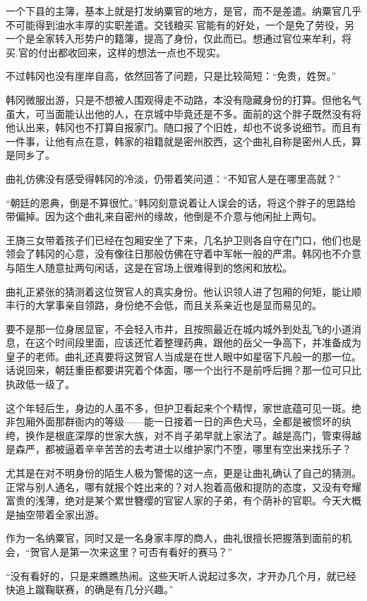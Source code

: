 一个下县的主簿，基本上就是打发纳粟官的地方，是官，而不是差遣。纳粟官几乎不可能得到油水丰厚的实职差遣。交钱粮买.官能有的好处，一个是免了劳役，另一个是全家转入形势户的籍簿，提高了身份，仅此而已。想通过官位来牟利，将买.官的付出都收回来，这样的想法一点也不现实。

不过韩冈也没有崖岸自高，依然回答了问题，只是比较简短：“免贵，姓贺。”

韩冈微服出游，只是不想被人围观得走不动路，本没有隐藏身份的打算。但他名气虽大，可当面能认出他的人，在京城中毕竟还是不多。面前的这个胖子既然没有将他认出来，韩冈也不打算自报家门。随口报了个旧姓，却也不说多说细节。而且有一件事，让他有点在意，韩家的祖籍就是密州胶西，这个曲礼自称是密州人氏，算是同乡了。

曲礼仿佛没有感受得韩冈的冷淡，仍带着笑问道：“不知官人是在哪里高就？”

“朝廷的恩典，倒是不算很忙。”韩冈刻意说着让人误会的话，将这个胖子的思路给带偏掉。因为这个曲礼来自密州的缘故，他倒是不介意与他闲扯上两句。

王旖三女带着孩子们已经在包厢安坐了下来，几名护卫则各自守在门口，他们也是领会了韩冈的心意，没有像往日那般仿佛在守着中军帐一般的严肃。韩冈也不介意与陌生人随意扯两句闲话，这是在官场上很难得到的悠闲和放松。

曲礼正紧张的猜测着这位贺官人的真实身份。他认识领人进了包厢的何矩，能让顺丰行的大掌事亲自领路，身份绝不会低，而且关系亲近也是显而易见的。

要不是那一位身居显宦，不会轻入市井，且按照最近在城内城外到处乱飞的小道消息，在这个时间段里面，应该还忙着整理药典，跟他的岳父一争高下，并准备成为皇子的老师。曲礼还真要将这贺官人当成是在世人眼中如星宿下凡般一的那一位。话说回来，朝廷重臣都要讲究着个体面，哪一个出行不是前呼后拥？那一位可只比执政低一级了。

这个年轻后生，身边的人虽不多，但护卫看起来个个精悍，家世底蕴可见一斑。绝非包厢外面那群衙内的等级——能一日接着一日的声色犬马，全都是被惯坏的纨绔，换作是根底深厚的世家大族，对不肖子弟早就上家法了。越是高门，管束得越是森严，都被逼着辛辛苦苦的去考进士以维护家门不堕，哪里有空出来找乐子？

尤其是在对不明身份的陌生人极为警惕的这一点，更是让曲礼确认了自己的猜测。正常与别人通名，哪有就报个姓出来的？对人抱着高傲和提防的态度，又没有夸耀富贵的浅薄，绝对是某个累世簪缨的官宦人家的子弟，有个荫补的官职。今天大概是抽空带着全家出游。

作为一名纳粟官，同时又是一名身家丰厚的商人，曲礼很擅长把握落到面前的机会，“贺官人是第一次来这里？可否有看好的赛马？”

“没有看好的，只是来瞧瞧热闹。这些天听人说起过多次，才开办几个月，就已经快追上蹴鞠联赛，的确是有几分兴趣。”

